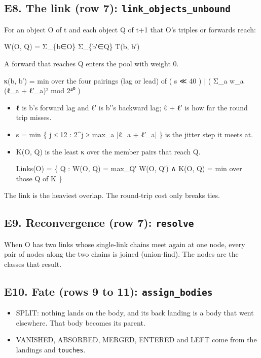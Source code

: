 \subsection{\texorpdfstring{E8. The link (row 7): \texttt{link\_\allowbreak{}objects\_\allowbreak{}unbound}}{E8. The link (row 7): link\_objects\_unbound}}

For an object O of t and each object Q of t+1 that O's triples or forwards reach:

W(O, Q) = Σ\_\allowbreak{}\{b∈O\} Σ\_\allowbreak{}\{b′∈Q\} T(b, b′)

A forward that reaches Q enters the pool with weight 0.

κ(b, b′) = min over the four pairings (lag or lead) of  ( s ≪ 40 ) | ( Σ\_\allowbreak{}a w\_\allowbreak{}a (ℓ\_\allowbreak{}a + ℓ′\_\allowbreak{}a)²  mod 2⁴⁰ )

\begin{itemize}
\item ℓ is b's forward lag and ℓ′ is b′'s backward lag; ℓ + ℓ′ is how far the round trip misses.
\item s = min \{ j ≤ 12 : 2\textasciicircum{}j ≥ max\_\allowbreak{}a |ℓ\_\allowbreak{}a + ℓ′\_\allowbreak{}a| \} is the jitter step it meets at.
\item K(O, Q) is the least κ over the member pairs that reach Q.

Links(O) = \{ Q : W(O, Q) = max\_\allowbreak{}Q′ W(O, Q′) ∧ K(O, Q) = min over those Q of K \}
\end{itemize}

The link is the heaviest overlap. The round-trip cost only breaks ties.

\subsection{\texorpdfstring{E9. Reconvergence (row 7): \texttt{resolve}}{E9. Reconvergence (row 7): resolve}}

When O has two links whose single-link chains meet again at one node, every pair of nodes along the two chains is joined (union-find). The nodes are the classes that result.

\subsection{\texorpdfstring{E10. Fate (rows 9 to 11): \texttt{assign\_\allowbreak{}bodies}}{E10. Fate (rows 9 to 11): assign\_bodies}}

\begin{itemize}
\item SPLIT: nothing lands on the body, and its back landing is a body that went elsewhere. That body becomes its parent.
\item VANISHED, ABSORBED, MERGED, ENTERED and LEFT come from the landings and \texttt{touches}.
\end{itemize}

